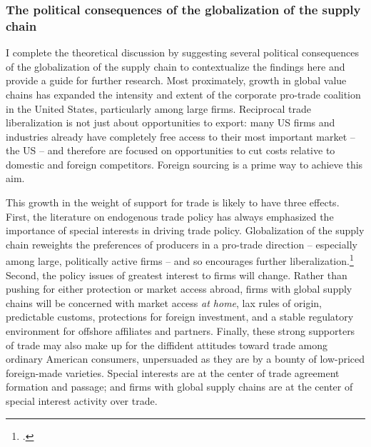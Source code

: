 \documentclass[hidelinks,12pt,letter]{article}
\begin{document}

\subsubsection*{The political consequences of the globalization of the supply chain}
I complete the theoretical discussion by suggesting several political consequences of the globalization of the supply chain to contextualize the findings here and provide a guide for further research. Most proximately, growth in global value chains has expanded the intensity and extent of the corporate pro-trade coalition in the United States, particularly among large firms. Reciprocal trade liberalization is not just about opportunities to export: many US firms and industries already have completely free access to their most important market -- the US -- and therefore are focused on opportunities to cut costs relative to domestic and foreign competitors. Foreign sourcing is a prime way to achieve this aim.  

This growth in the weight of support for trade is likely to have three effects. First, the literature on endogenous trade policy has always emphasized the importance of special interests in driving trade policy. %
Globalization of the supply chain reweights the preferences of producers in a pro-trade direction -- especially among large, politically active firms -- and so encourages further liberalization.\footnote{\citealt{milner1988resisting}.} Second, the policy issues of greatest interest to firms will change. Rather than pushing for either protection or market access abroad, firms with global supply chains will be concerned with market access \emph{at home}, lax rules of origin, predictable customs, protections for foreign investment, and a stable regulatory environment for offshore affiliates and partners. Finally, these strong supporters of trade may also make up for the diffident attitudes toward trade among ordinary American consumers, unpersuaded as they are by a bounty of low-priced foreign-made varieties. Special interests are at the center of trade agreement formation and passage; and firms with global supply chains are at the center of special interest activity over trade.
\end{document}
